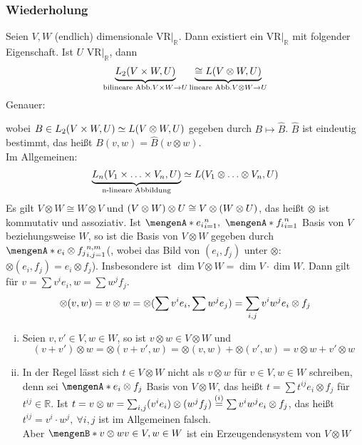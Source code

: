 \subsubsection[Wiederholung:Tensorprodukt von Vektorräumen]{Wiederholung}
\label{ssub:170}
Seien $V,W$ (endlich) dimensionale VR$\vert_{\mathds{R}}$. Dann existiert ein VR$\vert_{\mathds{R}}$ mit folgender Eigenschaft. Ist $U$ VR$\vert_{\mathds{R}}$, dann
\[
\underbrace{L_2(V\times W, U)}_{\text{bilineare Abb.} V\times W\to U} \underbrace{\cong L(V\otimes W, U)}_{\text{lineare Abb.}V\otimes W \to U}
\]
Genauer:
\begin{figure}[H]
\end{figure}
wobei $B\in L_2(V\times W, U) \simeq L (V\otimes W, U)$ gegeben durch $B\mapsto \hat{B}$. $\hat{B}$ ist eindeutig bestimmt, das heißt $B(v,w) = \hat{B}(v\otimes w)$.\\
Im Allgemeinen:
\[
\underbrace{L_n(V_1\times \ldots \times V_n, U)}_{\text{n-lineare Abbildung}} \simeq L(V_1\otimes \ldots \otimes V_n, U)
\]
Es gilt $V\otimes W\cong W\otimes V$ und $(V\otimes W) \otimes U \cong V\otimes (W\otimes U)$, das heißt $\otimes$ ist kommutativ und assoziativ. 
 Ist $\set{e_i}_{i = 1}^n,\ \set{f_i}_{i = 1}^n$ Basis von $V$ beziehungsweise $W$, so ist die Basis von $V\otimes W$ gegeben durch $\set{e_i\otimes f_j}_{i,j = 1}^{n,m}$(, wobei das Bild von $(e_i,f_j)$ unter $\otimes$: $\otimes(e_i,f_j) = e_i \otimes f_j$). Insbesondere ist $\dim V\otimes W = \dim V \cdot \dim W$. Dann gilt für $v = \sum v^i e_i,w = \sum w^j f_j$.
\[
\otimes(v,w) = v\otimes w = \otimes(\sum v^i e_i, \sum w^j e_j) = \sum_{i,j} v^i w^j e_i\otimes f_j
\]
\begin{enumerate}[(i)]
\item Seien $v,v'\in V, w\in W$, so ist $v\otimes w\in V\otimes W$ und 
\[
(v+v')\otimes w = \otimes (v+v',w) = \otimes (v,w) + \otimes (v',w) = v\otimes w + v'\otimes w
\]
\item In der Regel lässt sich $t\in V\otimes W$ nicht als $v\otimes w$ für $v\in V,w\in W$ schreiben, denn sei $\set{e_i\otimes f_j}$ Basis von $V\otimes W$, das heißt $t = \sum t^{ij} e_i\otimes f_j$ für $t^{ij}\in \mathds{R}$. Ist $t = v\otimes w = \sum_{i,j} (v^i e_i)\otimes (w^j f_j) \overset{(i)}{=} \sum v^i w^j e_i\otimes f_j$, das heißt $t^{ij} = v^i\cdot w^j,\ \forall i,j$ ist im Allgemeinen falsch.\\
Aber $\set[v\otimes w]{v\in V, w\in W}$ ist ein Erzeugendensystem von $V\otimes W$
\end{enumerate}

